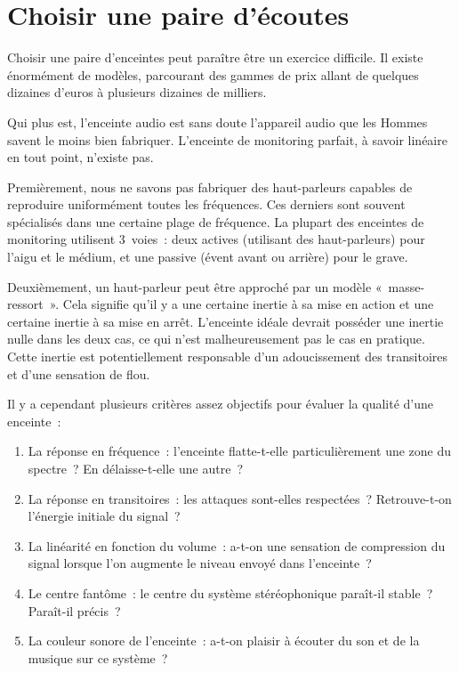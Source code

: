 \documentclass[
]{book}
\providecommand{\tightlist}{%
  \setlength{\itemsep}{0pt}\setlength{\parskip}{0pt}}
\begin{document}
\hypertarget{choisir-une-paire-duxe9coutes}{%
\section{Choisir une paire d'écoutes}\label{choisir-une-paire-duxe9coutes}}

Choisir une paire d'enceintes peut paraître être un exercice difficile. Il existe énormément de modèles, parcourant des gammes de prix allant de quelques dizaines d'euros à plusieurs dizaines de milliers.

Qui plus est, l'enceinte audio est sans doute l'appareil audio que les Hommes savent le moins bien fabriquer. L'enceinte de monitoring parfait, à savoir linéaire en tout point, n'existe pas.

Premièrement, nous ne savons pas fabriquer des haut-parleurs capables de reproduire uniformément toutes les fréquences. Ces derniers sont souvent spécialisés dans une certaine plage de fréquence. La plupart des enceintes de monitoring utilisent 3~voies~: deux actives (utilisant des haut-parleurs) pour l'aigu et le médium, et une passive (évent avant ou arrière) pour le grave.

Deuxièmement, un haut-parleur peut être approché par un modèle «~masse-ressort~». Cela signifie qu'il y a une certaine inertie à sa mise en action et une certaine inertie à sa mise en arrêt. L'enceinte idéale devrait posséder une inertie nulle dans les deux cas, ce qui n'est malheureusement pas le cas en pratique. Cette inertie est potentiellement responsable d'un adoucissement des transitoires et d'une sensation de flou.

Il y a cependant plusieurs critères assez objectifs pour évaluer la qualité d'une enceinte~:

\begin{enumerate}
\def\labelenumi{\arabic{enumi}.}
\tightlist
\item
  La réponse en fréquence~: l'enceinte flatte-t-elle particulièrement une zone du spectre~? En délaisse-t-elle une autre~?
\item
  La réponse en transitoires~: les attaques sont-elles respectées~? Retrouve-t-on l'énergie initiale du signal~?
\item
  La linéarité en fonction du volume~: a-t-on une sensation de compression du signal lorsque l'on augmente le niveau envoyé dans l'enceinte~?
\item
  Le centre fantôme~: le centre du système stéréophonique paraît-il stable~? Paraît-il précis~?
\item
  La couleur sonore de l'enceinte~: a-t-on plaisir à écouter du son et de la musique sur ce système~?
\end{enumerate}
\end{document}

